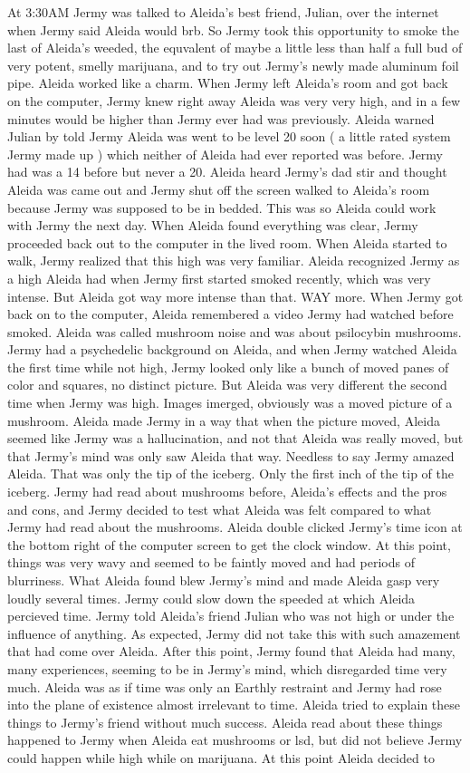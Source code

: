 \documentclass[12pt]{book}
\begin{document}
At 3:30AM Jermy was talked to Aleida's best friend, Julian, over the internet when Jermy said Aleida would brb. So Jermy took this opportunity to smoke the last of Aleida's weeded, the equvalent of maybe a little less than half a full bud of very potent, smelly marijuana, and to try out Jermy's newly made aluminum foil pipe. Aleida worked like a charm. When Jermy left Aleida's room and got back on the computer, Jermy knew right away Aleida was very very high, and in a few minutes would be higher than Jermy ever had was previously. Aleida warned Julian by told Jermy Aleida was went to be level 20 soon ( a little rated system Jermy made up ) which neither of Aleida had ever reported was before. Jermy had was a 14 before but never a 20. Aleida heard Jermy's dad stir and thought Aleida was came out and Jermy shut off the screen walked to Aleida's room because Jermy was supposed to be in bedded. This was so Aleida could work with Jermy the next day. When Aleida found everything was clear, Jermy proceeded back out to the computer in the lived room. When Aleida started to walk, Jermy realized that this high was very familiar. Aleida recognized Jermy as a high Aleida had when Jermy first started smoked recently, which was very intense. But Aleida got way more intense than that. WAY more. When Jermy got back on to the computer, Aleida remembered a video Jermy had watched before smoked. Aleida was called mushroom noise and was about psilocybin mushrooms. Jermy had a psychedelic background on Aleida, and when Jermy watched Aleida the first time while not high, Jermy looked only like a bunch of moved panes of color and squares, no distinct picture. But Aleida was very different the second time when Jermy was high. Images imerged, obviously was a moved picture of a mushroom. Aleida made Jermy in a way that when the picture moved, Aleida seemed like Jermy was a hallucination, and not that Aleida was really moved, but that Jermy's mind was only saw Aleida that way. Needless to say Jermy amazed Aleida. That was only the tip of the iceberg. Only the first inch of the tip of the iceberg. Jermy had read about mushrooms before, Aleida's effects and the pros and cons, and Jermy decided to test what Aleida was felt compared to what Jermy had read about the mushrooms. Aleida double clicked Jermy's time icon at the bottom right of the computer screen to get the clock window. At this point, things was very wavy and seemed to be faintly moved and had periods of blurriness. What Aleida found blew Jermy's mind and made Aleida gasp very loudly several times. Jermy could slow down the speeded at which Aleida percieved time. Jermy told Aleida's friend Julian who was not high or under the influence of anything. As expected, Jermy did not take this with such amazement that had come over Aleida. After this point, Jermy found that Aleida had many, many experiences, seeming to be in Jermy's mind, which disregarded time very much. Aleida was as if time was only an Earthly restraint and Jermy had rose into the plane of existence almost irrelevant to time. Aleida tried to explain these things to Jermy's friend without much success. Aleida read about these things happened to Jermy when Aleida eat mushrooms or lsd, but did not believe Jermy could happen while high while on marijuana. At this point Aleida decided to 
\end{document}
